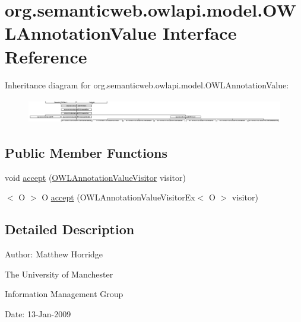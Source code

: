 \hypertarget{interfaceorg_1_1semanticweb_1_1owlapi_1_1model_1_1_o_w_l_annotation_value}{\section{org.\-semanticweb.\-owlapi.\-model.\-O\-W\-L\-Annotation\-Value Interface Reference}
\label{interfaceorg_1_1semanticweb_1_1owlapi_1_1model_1_1_o_w_l_annotation_value}
}
Inheritance diagram for org.\-semanticweb.\-owlapi.\-model.\-O\-W\-L\-Annotation\-Value\-:\begin{figure}[H]
\begin{center}
\leavevmode
\includegraphics[height=1.111111cm]{interfaceorg_1_1semanticweb_1_1owlapi_1_1model_1_1_o_w_l_annotation_value}
\end{center}
\end{figure}
\subsection*{Public Member Functions}
\begin{DoxyCompactItemize}
\item 
void \hyperlink{interfaceorg_1_1semanticweb_1_1owlapi_1_1model_1_1_o_w_l_annotation_value_aed6d84c82eb3ebfdd81589b964b046a6}{accept} (\hyperlink{interfaceorg_1_1semanticweb_1_1owlapi_1_1model_1_1_o_w_l_annotation_value_visitor}{O\-W\-L\-Annotation\-Value\-Visitor} visitor)
\item 
$<$ O $>$ O \hyperlink{interfaceorg_1_1semanticweb_1_1owlapi_1_1model_1_1_o_w_l_annotation_value_aa674c223100f53e3df1443b9aa31154c}{accept} (O\-W\-L\-Annotation\-Value\-Visitor\-Ex$<$ O $>$ visitor)
\end{DoxyCompactItemize}


\subsection{Detailed Description}
Author\-: Matthew Horridge\par
 The University of Manchester\par
 Information Management Group\par
 Date\-: 13-\/\-Jan-\/2009 

